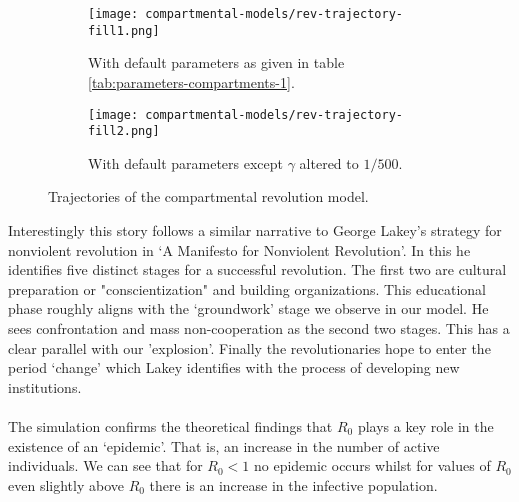 \begin{figure}[h!]
	\begin{subfigure}{\textwidth}
	\centering
	\texttt{[image: compartmental-models/rev-trajectory-fill1.png]}
	\caption{With default parameters as given in table \ref{tab:parameters-compartments-1}.}
	\label{fig:rev-traj-default}
	\end{subfigure}
	\begin{subfigure}{\textwidth}
	\centering
	\texttt{[image: compartmental-models/rev-trajectory-fill2.png]}
	\caption{With default parameters except $\gamma$ altered to $1/500$.
	}
	\label{fig:rev-traj-diff-gamma}
	\end{subfigure}
\caption{Trajectories of the compartmental revolution model.}
\end{figure}
\bigskip
Interestingly this story follows a similar narrative to George Lakey's strategy for nonviolent revolution in `A Manifesto for Nonviolent Revolution'\cite{lakey_1972}. In this he identifies five distinct stages for a successful revolution. The first two are cultural preparation or "conscientization" and building organizations. This educational phase roughly aligns with the `groundwork' stage we observe in our model. He sees confrontation and mass non-cooperation as the second two stages. This has a clear parallel with our 'explosion'. Finally the revolutionaries hope to enter the period `change' which Lakey identifies with the process of developing new institutions.\\
\\
The simulation confirms the theoretical findings that $R_0$ plays a key role in the existence of an `epidemic'. That is, an increase in the number of active individuals. We can see that for $R_0<1$ no epidemic occurs whilst for values of $R_0$ even slightly above $R_0$ there is an increase in the infective population.
